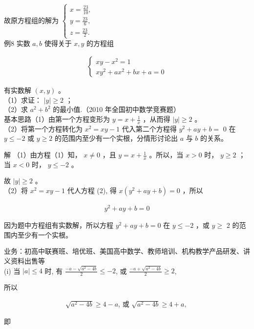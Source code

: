 \documentclass[10pt]{article}
\begin{document}
故原方程组的解为 $\left\{\begin{array}{l}x=\frac{23}{10}, \\ y=\frac{23}{6}, \\ z=\frac{23}{2} .\end{array}\right.$\\
例8 实数 $a, b$ 使得关于 $x, y$ 的方程组

\begin{align*}
\left\{\begin{array}{l}
x y-x^{2}=1  \tag{1}\\
x y^{2}+a x^{2}+b x+a=0
\end{array}\right.
\end{align*}

有实数解 $(x, y)$ 。\\
（1）求证： $|y| \geqslant 2$ ；\\
（2）求 $a^{2}+b^{2}$ 的最小值.（2010 年全国初中数学竞赛题）\\
基本思路（1）由第一个方程变形为 $y=x+\frac{1}{x}$ ，从而得 $|y| \geqslant 2$ 。\\
（2）将第一个方程转化为 $x^{2}=x y-1$ 代入第二个方程得 $y^{2}+a y+b=$ 0 在 $y \leqslant-2$ 或 $y \geqslant 2$ 的范围内至少有一个实根，分情形讨论出 $a$ 与 $b$ 的关系。

解 （1）由方程（1）知， $x \neq 0$ ，且 $y=x+\frac{1}{x}$ 。所以，当 $x>0$ 时， $y \geqslant 2$ ；当 $x<0$ 时， $y \leqslant-2$ 。

故 $|y| \geqslant 2$ 。\\
（2）将 $x^{2}=x y-1$ 代人方程 (2), 得 $x\left(y^{2}+a y+b\right)=0$ ，所以

\begin{align*}
y^{2}+a y+b=0
\end{align*}

因为题中方程组有实数解，所以方程 $y^{2}+a y+b=0$ 在 $y \leqslant-2$ ，或 $y \geqslant$ 2 的范围内至少有一个实根。

业务：初高中联赛班、培优班、美国高中数学、教师培训、机构教学产品研发、讲义资料出售等\\
(i) 当 $|a| \leqslant 4$ 时, 有 $\frac{-a-\sqrt{a^{2}-4 b}}{2} \leqslant-2$, 或 $\frac{-a+\sqrt{a^{2}-4 b}}{2} \geqslant 2$,

所以

\begin{align*}
\sqrt{a^{2}-4 b} \geqslant 4-a \text {, 或 } \sqrt{a^{2}-4 b} \geqslant 4+a \text {, }
\end{align*}

即
\end{document}
